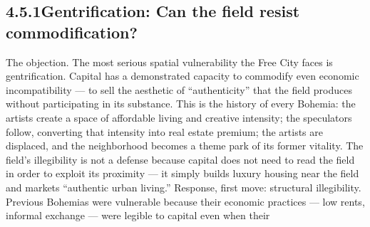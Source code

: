 \subsection{4.5.1\quad Gentrification: Can the field resist commodification?}

The objection. The most serious spatial vulnerability the Free City faces is gentrification. Capital has a demonstrated capacity to commodify even economic incompatibility — to sell the aesthetic of “authenticity” that the field produces without participating in its substance. This is the history of every Bohemia: the artists create a space of affordable living and creative intensity; the speculators follow, converting that intensity into real estate premium; the artists are displaced, and the neighborhood becomes a theme park of its former vitality. The field’s illegibility is not a defense because capital does not need to read the field in order to exploit its proximity — it simply builds luxury housing near the field and markets “authentic urban living.” Response, first move: structural illegibility. Previous Bohemias were vulnerable because their economic practices — low rents, informal exchange — were legible to capital even when their

